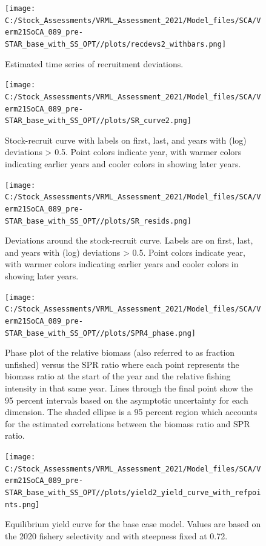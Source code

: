 \documentclass[11pt,
  english,
  a4paper,
]{article}
\begin{document}
\begin{figure}
\centering
\texttt{[image: C:/Stock\_Assessments/VRML\_Assessment\_2021/Model\_files/SCA/Verm21SoCA\_089\_pre-STAR\_base\_with\_SS\_OPT//plots/recdevs2\_withbars.png]}
\caption{Estimated time series of recruitment deviations.\label{fig:recdevs}}
\end{figure}

\begin{figure}
\centering
\texttt{[image: C:/Stock\_Assessments/VRML\_Assessment\_2021/Model\_files/SCA/Verm21SoCA\_089\_pre-STAR\_base\_with\_SS\_OPT//plots/SR\_curve2.png]}
\caption{Stock-recruit curve with labels on first, last, and years with (log) deviations \textgreater{} 0.5. Point colors indicate year, with warmer colors indicating earlier years and cooler colors in showing later years.\label{fig:bh-curve}}
\end{figure}

\begin{figure}
\centering
\texttt{[image: C:/Stock\_Assessments/VRML\_Assessment\_2021/Model\_files/SCA/Verm21SoCA\_089\_pre-STAR\_base\_with\_SS\_OPT//plots/SR\_resids.png]}
\caption{Deviations around the stock-recruit curve. Labels are on first, last, and years with (log) deviations \textgreater{} 0.5. Point colors indicate year, with warmer colors indicating earlier years and cooler colors in showing later years.\label{fig:bh-resids}}
\end{figure}

\FloatBarrier

\begin{figure}
\centering
\texttt{[image: C:/Stock\_Assessments/VRML\_Assessment\_2021/Model\_files/SCA/Verm21SoCA\_089\_pre-STAR\_base\_with\_SS\_OPT//plots/SPR4\_phase.png]}
\caption{Phase plot of the relative biomass (also referred to as fraction unfished) versus the SPR ratio where each point represents the biomass ratio at the start of the year and the relative fishing intensity in that same year. Lines through the final point show the 95 percent intervals based on the asymptotic uncertainty for each dimension. The shaded ellipse is a 95 percent region which accounts for the estimated correlations between the biomass ratio and SPR ratio.\label{fig:phase}}
\end{figure}

\begin{figure}
\centering
\texttt{[image: C:/Stock\_Assessments/VRML\_Assessment\_2021/Model\_files/SCA/Verm21SoCA\_089\_pre-STAR\_base\_with\_SS\_OPT//plots/yield2\_yield\_curve\_with\_refpoints.png]}
\caption{Equilibrium yield curve for the base case model. Values are based on the 2020 fishery selectivity and with steepness fixed at 0.72.\label{fig:yield2}}
\end{figure}
\end{document}
